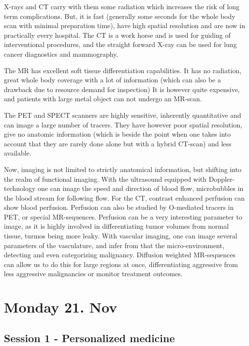 \documentclass[12p]{article}
\begin{document}
X-rays and CT carry with them some radiation which increases the risk of long term complications.
But, it is fast (generally some seconds for the whole body scan with minimal preparation time), have high spatial resolution and are now in practically every hospital.
The CT is a work horse and is used for guiding of interventional procedures, and the straight forward X-ray can be used for lung cancer diagnostics and mammography.

The MR has excellent soft tissue differentiation capabilities.
It has no radiation, great whole body coverage with a lot of information (which can also be a drawback due to resource demand for inspection)
It is however quite expensive, and patients with large metal object can not undergo an MR-scan.

The PET and SPECT scanners are highly sensitive, inherently quantitative and can image a large number of tracers.
They have however poor spatial resolution, give no anatomic information (which is beside the point when one takes into account that they are rarely done alone but with a hybrid CT-scan) and less available.

Now, imaging is not limited to strictly anatomical information, but shifting into the realm of functional imaging.
With the ultrasound equipped with Doppler-technology one can image the speed and direction of blood flow, microbubbles in the blood stream for following flow.
For the CT, contrast enhanced perfusion can show blood perfusion.
Perfusion can also be studied by O-mediated tracers in PET, or special MR-sequences.
Perfusion can be a very interesting parameter to image, as it is highly involved in differentiating tumor volumes from normal tissue, turmos being more leaky.
With vascular imaging, one can image several parameters of the vasculature, and infer from that the micro-environment, detecting and even categorizing malignancy.
Diffusion weighted MR-sequences can allow us to do this for large regions at once, differentiating aggressive from less aggressive malignancies or monitor treatment outcomes.


\section*{Monday 21. Nov}

\subsection*{Session 1 - Personalized medicine}
\end{document}
